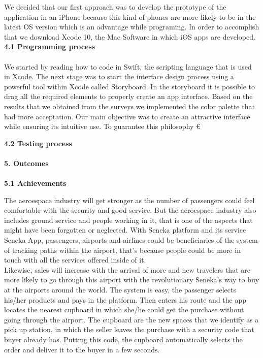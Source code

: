 \documentclass[]{article}
\begin{document}
We decided that our first approach was to develop the prototype of the application in an iPhone because this kind of phones are more likely to be in the latest OS version which is an advantage while programing. In order to accomplish that we download Xcode 10, the Mac Software in which iOS apps are developed.\\

\Large{\textbf{4.1 Programming process}\\}\\

We started by reading how to code in Swift, the scripting language that is used in Xcode. The next stage was to start the interface design process using a powerful tool within Xcode called Storyboard. In the storyboard it is possible to drag all the required elements to properly create an app interface. Based on the results that we obtained from the surveys we implemented the color palette that had more acceptation. Our main objective was to create an attractive interface while ensuring its intuitive use. To guarantee this philosophy €

\Large{\textbf{4.2 Testing process}\\}\\


\Large{\textbf{5. Outcomes}\\}\\

\Large{\textbf{5.1 Achievements}\\}

The aeroespace industry will get stronger as the number of passengers could feel comfortable with the security and good service. But the aeroespace industry also includes ground service and people working in it, that is one of the aspects that might have been forgotten or neglected. With Seneka platform and its service Seneka App, passengers, airports and airlines could be beneficiaries of the system of tracking paths within the airport, that's because people could be more in touch with all the services offered inside of it.\\

Likewise, sales will increase with the arrival of more and new travelers that are more likely to go through this airport with the revolutionary Seneka's way to buy at the airports around the world. The system is easy, the passenger selects his/her products and pays in the platform. Then enters his route and the app locates the nearest cupboard in which she/he could get the purchase without going through the airport. The cupboard are the new spaces that we identify as a pick up station, in which the seller leaves the purchase with a security code that buyer already has. Putting this code, the cupboard automatically selects the order and deliver it to the buyer in a few seconds.\\
\end{document}

